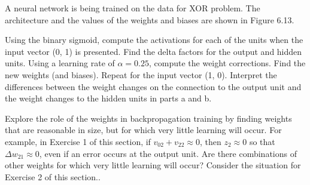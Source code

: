 \begin{problem}[6]
A neural network is being trained on the data for XOR problem. The architecture and the values of the weights and biases are shown in Figure 6.13.

\ppart Using the binary sigmoid, compute the activations for each of the units when the input vector (0, 1) is presented. Find the delta factors for the output and hidden units. Using a learning rate of $α = 0.25$, compute the weight corrections. Find the new weights (and biases).
\ppart Repeat for the input vector (1, 0).
\ppart Interpret the differences between the weight changes on the connection to the output unit and the weight changes to the hidden units in parts a and b.
\solution
\end{problem}

\begin{problem}[7]
Explore the role of the weights in backpropagation training by finding weights that are reasonable in size, but for which very little learning will occur. For example, in Exercise 1 of this section, if $v_{02}+v_{22}\approx 0$, then $z_2 \approx 0$ so that $Δw_{21}\approx 0$, even if an error occurs at the output unit. Are there combinations of other weights for which very little
learning will occur? Consider the situation for Exercise 2 of this section..

\solution
\end{problem}